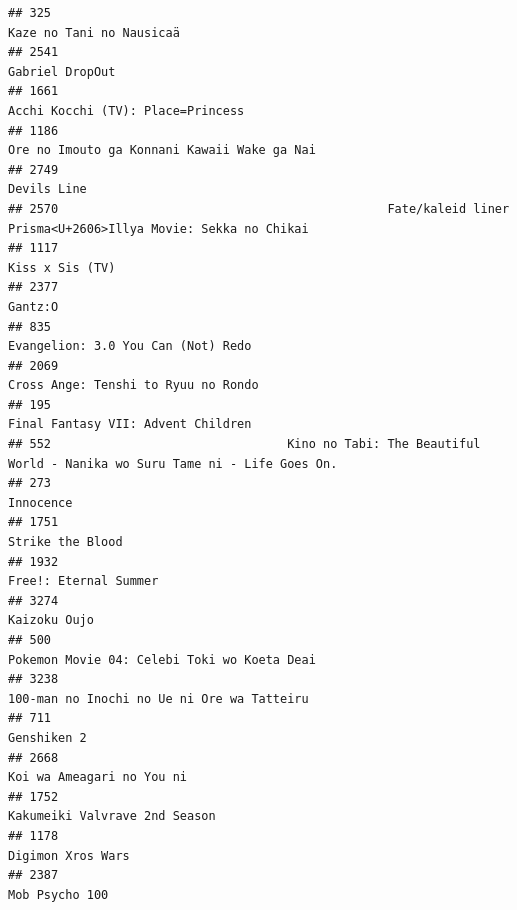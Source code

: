 \documentclass[
]{article}
\begin{document}
\begin{verbatim}
## 325                                                                                   Kaze no Tani no Nausicaä
## 2541                                                                                           Gabriel DropOut
## 1661                                                                         Acchi Kocchi (TV): Place=Princess
## 1186                                                               Ore no Imouto ga Konnani Kawaii Wake ga Nai
## 2749                                                                                               Devils Line
## 2570                                              Fate/kaleid liner Prisma<U+2606>Illya Movie: Sekka no Chikai
## 1117                                                                                           Kiss x Sis (TV)
## 2377                                                                                                   Gantz:O
## 835                                                                         Evangelion: 3.0 You Can (Not) Redo
## 2069                                                                       Cross Ange: Tenshi to Ryuu no Rondo
## 195                                                                         Final Fantasy VII: Advent Children
## 552                                 Kino no Tabi: The Beautiful World - Nanika wo Suru Tame ni - Life Goes On.
## 273                                                                                                  Innocence
## 1751                                                                                          Strike the Blood
## 1932                                                                                     Free!: Eternal Summer
## 3274                                                                                              Kaizoku Oujo
## 500                                                                Pokemon Movie 04: Celebi Toki wo Koeta Deai
## 3238                                                                100-man no Inochi no Ue ni Ore wa Tatteiru
## 711                                                                                                Genshiken 2
## 2668                                                                                 Koi wa Ameagari no You ni
## 1752                                                                             Kakumeiki Valvrave 2nd Season
## 1178                                                                                         Digimon Xros Wars
## 2387                                                                                            Mob Psycho 100

\end{verbatim}
\end{document}
